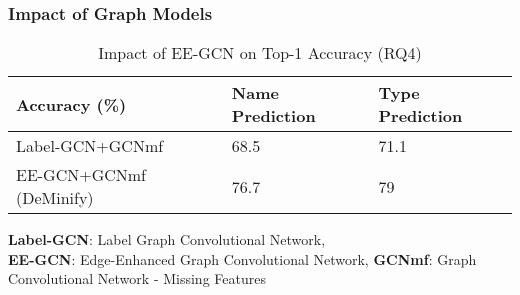 \subsubsection{Impact of Graph Models}
\label{sec:models}

\begin{table}[t]%
  \centering
  \caption{Impact of EE-GCN on Top-1 Accuracy (RQ4)}
  \vspace{-6pt}
  \tabcolsep 2.5pt
    \begin{tabular}{|l|l|l|}
    \hline
        Accuracy (\%) & Name Prediction & Type Prediction\\ \hline
        Label-GCN+GCNmf & 68.5 & 71.1 \\ \hline
        EE-GCN+GCNmf (DeMinify) & 76.7 & 79 \\ \hline
    \end{tabular}
    {\bf Label-GCN}: Label Graph Convolutional Network,\\ {\bf EE-GCN}: Edge-Enhanced Graph Convolutional Network, {\bf GCNmf}: Graph Convolutional Network - Missing Features
    \label{tab:sensi-graph}
\end{table}





